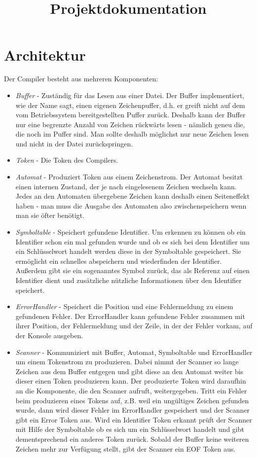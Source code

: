 \documentclass[a4paper,11pt,titlepage,openany,oneside]{scrbook}
\title{Projektdokumentation}
\author{}
\begin{document}
\maketitle

\tableofcontents
\newpage

\chapter{Architektur}

Der Compiler besteht aus mehreren Komponenten:
\begin{itemize}
    \item \textit{Buffer} - Zuständig für das Lesen aus einer Datei. Der Buffer implementiert, wie der Name sagt, einen eigenen Zeichenpuffer, d.h. er greift nicht auf dem vom Betriebssystem bereitgestellten Puffer zurück. Deshalb kann der Buffer nur eine begrenzte Anzahl von Zeichen rückwärts lesen - nämlich geneu die, die noch im Puffer sind. Man sollte deshalb möglichst nur neue Zeichen lesen und nicht in der Datei zurückspringen.
    \item \textit{Token} - Die Token des Compilers.
    \item \textit{Automat} - Produziert Token aus einem Zeichenstrom. Der Automat besitzt einen internen Zustand, der je nach eingelesenem Zeichen wechseln kann. Jedes an den Automaten übergebene Zeichen kann deshalb einen Seiteneffekt haben - man muss die Ausgabe des Automaten also zwischenspeichern wenn man sie öfter benötigt.
    \item \textit{Symboltable} - Speichert gefundene Identifier. Um erkennen zu können ob ein Identifier schon ein mal gefunden wurde und ob es sich bei dem Identifier um ein Schlüsselwort handelt werden diese in der Symboltable gespeichert. Sie ermöglicht ein schnelles abspeichern und wiederfinden der Identifier. Außerdem gibt sie ein sogenanntes Symbol zurück, das als Referenz auf einen Identifier dient und zusätzliche nützliche Informationen über den Identifier speichert.
    \item \textit{ErrorHandler} - Speichert die Position und eine Fehlermeldung zu einem gefundenen Fehler. Der ErrorHandler kann gefundene Fehler zusammen mit ihrer Position, der Fehlermeldung und der Zeile, in der der Fehler vorkam, auf der Konsole ausgeben.
    \item \textit{Scanner} - Kommuniziert mit Buffer, Automat, Symboltable und ErrorHandler um einem Tokenstrom zu produzieren. Dabei nimmt der Scanner so lange Zeichen aus dem Buffer entgegen und gibt diese an den Automat weiter bis dieser einen Token produzieren kann. Der produzierte Token wird daraufhin an die Komponente, die den Scanner aufruft, weitergegeben. Tritt ein Fehler beim produzieren eines Tokens auf, z.B. weil ein ungültiges Zeichen gefunden wurde, dann wird dieser Fehler im ErrorHandler gespeichert und der Scanner gibt ein Error Token aus. Wird ein Identifier Token erkannt prüft der Scanner mit Hilfe der Symboltable ob es sich um ein Schlüsselwort handelt und gibt dementsprechend ein anderes Token zurück. Sobald der Buffer keine weiteren Zeichen mehr zur Verfügung stellt, gibt der Scanner ein EOF Token aus.
\end{itemize}
\end{document}
